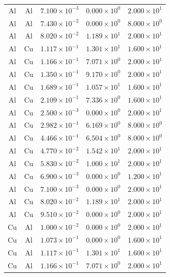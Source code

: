 \documentclass{article}
\begin{document}
\begin{longtable}{ccccc}
Al &  Al & $7.100 \times 10^{-3}$ & $0.000 \times 10^{0}$ & $2.000 \times 10^{1}$ \\
Al &  Al & $7.430 \times 10^{-2}$ & $0.000 \times 10^{0}$ & $8.000 \times 10^{0}$ \\
Al &  Al & $8.020 \times 10^{-2}$ & $1.189 \times 10^{1}$ & $2.000 \times 10^{1}$ \\
Al &  Cu & $1.117 \times 10^{-1}$ & $1.301 \times 10^{1}$ & $1.600 \times 10^{1}$ \\
Al &  Cu & $1.166 \times 10^{-1}$ & $7.071 \times 10^{0}$ & $2.000 \times 10^{1}$ \\
Al &  Cu & $1.350 \times 10^{-1}$ & $9.170 \times 10^{0}$ & $2.000 \times 10^{1}$ \\
Al &  Cu & $1.689 \times 10^{-1}$ & $1.057 \times 10^{1}$ & $1.600 \times 10^{1}$ \\
Al &  Cu & $2.109 \times 10^{-1}$ & $7.336 \times 10^{0}$ & $1.600 \times 10^{1}$ \\
Al &  Cu & $2.500 \times 10^{-3}$ & $0.000 \times 10^{0}$ & $2.000 \times 10^{1}$ \\
Al &  Cu & $2.982 \times 10^{-1}$ & $6.169 \times 10^{0}$ & $8.000 \times 10^{0}$ \\
Al &  Cu & $4.466 \times 10^{-1}$ & $6.504 \times 10^{0}$ & $8.000 \times 10^{0}$ \\
Al &  Cu & $4.770 \times 10^{-2}$ & $1.542 \times 10^{1}$ & $2.000 \times 10^{1}$ \\
Al &  Cu & $5.830 \times 10^{-2}$ & $1.000 \times 10^{1}$ & $2.000 \times 10^{1}$ \\
Al &  Cu & $6.900 \times 10^{-3}$ & $0.000 \times 10^{0}$ & $1.200 \times 10^{1}$ \\
Al &  Cu & $7.100 \times 10^{-3}$ & $0.000 \times 10^{0}$ & $2.000 \times 10^{1}$ \\
Al &  Cu & $8.020 \times 10^{-2}$ & $1.189 \times 10^{1}$ & $2.000 \times 10^{1}$ \\
Al &  Cu & $9.510 \times 10^{-2}$ & $0.000 \times 10^{0}$ & $2.000 \times 10^{1}$ \\
Cu &  Al & $1.000 \times 10^{-2}$ & $0.000 \times 10^{0}$ & $2.000 \times 10^{1}$ \\
Cu &  Al & $1.073 \times 10^{-1}$ & $0.000 \times 10^{0}$ & $1.600 \times 10^{1}$ \\
Cu &  Al & $1.117 \times 10^{-1}$ & $1.301 \times 10^{1}$ & $1.600 \times 10^{1}$ \\
Cu &  Al & $1.166 \times 10^{-1}$ & $7.071 \times 10^{0}$ & $2.000 \times 10^{1}$ \\

\end{longtable}
\end{document}
